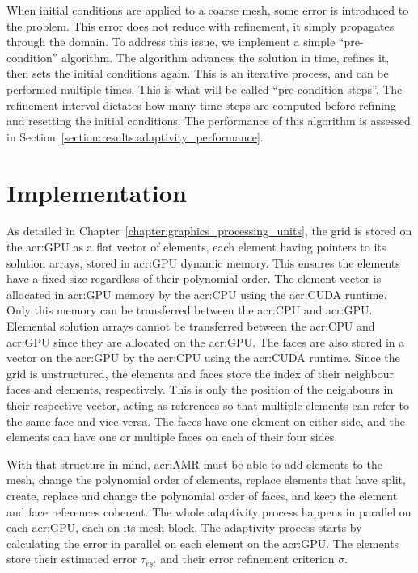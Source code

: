When initial conditions are applied to a coarse mesh, some error is introduced to the problem. This
error does not reduce with refinement, it simply propagates through the domain. To address this
issue, we implement a simple ``pre-condition'' algorithm. The algorithm advances the solution in
time, refines it, then sets the initial conditions again. This is an iterative process, and can be
performed multiple times. This is what will be called ``pre-condition steps''. The refinement
interval dictates how many time steps are computed before refining and resetting the initial
conditions. The performance of this algorithm is assessed in
Section~\ref{section:results:adaptivity_performance}.

\section{Implementation}\label{section:adaptive_mesh_refinement:implementation}

As detailed in Chapter~\ref{chapter:graphics_processing_units}, the grid is stored on the
\acrshort{acr:GPU} as a flat vector of elements, each element having pointers to its solution
arrays, stored in \acrshort{acr:GPU} dynamic memory. This ensures the elements have a fixed size
regardless of their polynomial order. The element vector is allocated in \acrshort{acr:GPU} memory
by the \acrshort{acr:CPU} using the \acrshort{acr:CUDA} runtime. Only this memory can be transferred
between the \acrshort{acr:CPU} and \acrshort{acr:GPU}. Elemental solution arrays cannot be
transferred between the \acrshort{acr:CPU} and \acrshort{acr:GPU} since they are allocated on the
\acrshort{acr:GPU}. The faces are also stored in a vector on the \acrshort{acr:GPU} by the
\acrshort{acr:CPU} using the \acrshort{acr:CUDA} runtime. Since the grid is unstructured, the
elements and faces store the index of their neighbour faces and elements, respectively. This is only
the position of the neighbours in their respective vector, acting as references so that multiple
elements can refer to the same face and vice versa. The faces have one element on either side, and
the elements can have one or multiple faces on each of their four sides.

With that structure in mind, \acrlong{acr:AMR} must be able to add elements to the mesh, change the
polynomial order of elements, replace elements that have split, create, replace and change the
polynomial order of faces, and keep the element and face references coherent. The whole adaptivity
process happens in parallel on each \acrshort{acr:GPU}, each on its mesh block. The adaptivity
process starts by calculating the error in parallel on each element on the \acrshort{acr:GPU}. The
elements store their estimated error \(\tau_{est}\) and their error refinement criterion \(\sigma
\).


